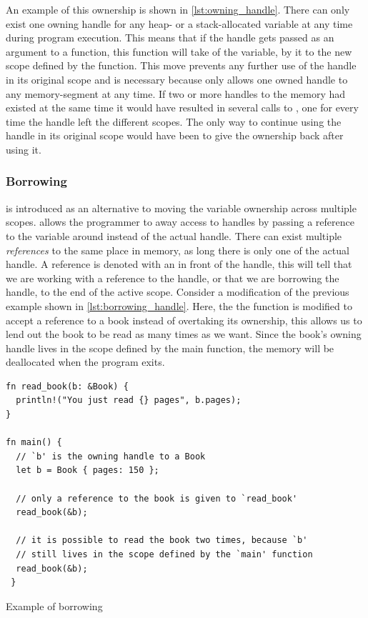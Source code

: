 An example of this ownership is shown in \autoref{lst:owning_handle}.
There can only exist one owning handle for any heap- or a stack-allocated variable at any time during program execution.
This means that if the handle gets passed as an argument to a function, this function will take  of the variable, by  it to the new scope defined by the function.
This move prevents any further use of the handle in its original scope and is necessary because {\rust} only allows one owned handle to any memory-segment at any time.
If two or more handles to the memory had existed at the same time it would have resulted in several calls to , one for every time the handle left the different scopes.
The only way to continue using the handle in its original scope would have been to give the ownership back after using it.

\subsubsection{Borrowing}
\label{ssec:borrowing}

 is introduced as an alternative to moving the variable ownership across multiple scopes.
\rust allows the programmer to  away access to handles by passing a reference to the variable around instead of the actual handle.
There can exist multiple \emph{references} to the same place in memory, as long there is only one  of the actual handle.
A reference is denoted with an \code{\&} in front of the handle, this will tell {\rust} that we are working with a reference to the handle, or that we are borrowing the handle, to the end of the active scope.
Consider a modification of the previous example shown in \autoref{lst:borrowing_handle}.
Here, the the  function is modified to accept a reference to a book instead of overtaking its ownership, this allows us to lend out the book to be read as many times as we want.
Since the book's owning handle lives in the scope defined by the main function, the memory will be deallocated when the program exits.

\begin{listing}[tb]
\begin{verbatim}
fn read_book(b: &Book) {
  println!("You just read {} pages", b.pages);
}

fn main() {
  // `b' is the owning handle to a Book
  let b = Book { pages: 150 };

  // only a reference to the book is given to `read_book'
  read_book(&b);

  // it is possible to read the book two times, because `b'
  // still lives in the scope defined by the `main' function
  read_book(&b);
 }
\end{verbatim}
\caption{Example of borrowing}
\label{lst:borrowing_handle}
\end{listing}

